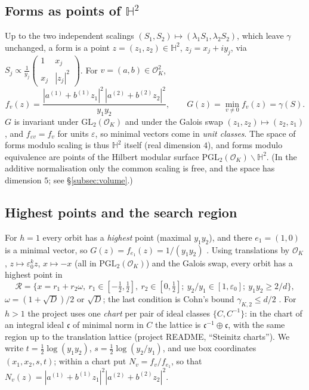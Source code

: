 \documentclass[11pt]{amsart}
\theoremstyle{definition}
\theoremstyle{remark}
\newcommand{\Hb}{\mathbb{H}}
\newcommand{\OK}{\mathcal{O}_K}
\newcommand{\GL}{\mathrm{GL}}
\newcommand{\PGL}{\mathrm{PGL}}
\newcommand{\gK}{\gamma_{K,2}}
\begin{document}
\subsection{Forms as points of $\Hb^2$}
Up to the two independent scalings $(S_1,S_2)\mapsto(\lambda_1S_1,\lambda_2S_2)$, which leave
$\gamma$ unchanged, a form is a point $z=(z_1,z_2)\in\Hb^2$, $z_j=x_j+iy_j$, via
$S_j\propto\frac1{y_j}\begin{pmatrix}1&x_j\\x_j&|z_j|^2\end{pmatrix}$.  For $v=(a,b)\in\OK^2$,
\[
f_v(z)=\frac{|a^{(1)}+b^{(1)}z_1|^2\,|a^{(2)}+b^{(2)}z_2|^2}{y_1y_2},\qquad
G(z)=\min_{v\ne0}f_v(z)=\gamma(S).
\]
$G$ is invariant under $\GL_2(\OK)$ and under the Galois swap $(z_1,z_2)\mapsto(z_2,z_1)$, and
$f_{\varepsilon v}=f_v$ for units $\varepsilon$, so minimal vectors come in \emph{unit classes}.
The space of forms modulo scaling is thus $\Hb^2$ itself (real dimension $4$), and forms modulo
equivalence are points of the Hilbert modular surface $\PGL_2(\OK)\backslash\Hb^2$.
(In the additive normalisation only the common scaling is free, and the space has dimension
$5$; see \S\ref{subsec:volume}.)

\subsection{Highest points and the search region}
For $h=1$ every orbit has a \emph{highest} point (maximal $y_1y_2$), and there $e_1=(1,0)$ is
a minimal vector, so $G(z)=f_{e_1}(z)=1/(y_1y_2)$ \cite[Prop.~1.1]{BCIO}.  Using translations
by $\OK$, $z\mapsto\varepsilon_0^kz$, $x\mapsto-x$ (all in $\PGL_2(\OK)$) and the Galois swap,
every orbit has a highest point in
\[
\mathcal R=\{x=r_1+r_2\omega,\ r_1\in[-\tfrac12,\tfrac12],\ r_2\in[0,\tfrac12];\
y_2/y_1\in[1,\varepsilon_0];\ y_1y_2\ge 2/d\},
\]
$\omega=(1+\sqrt D)/2$ or $\sqrt D$; the last condition is Cohn's bound $\gK\le d/2$
\cite{Cohn1,Cohn2}.  For $h>1$ the project uses one \emph{chart} per pair of ideal classes
$\{C,C^{-1}\}$: in the chart of an integral ideal $\mathfrak c$ of minimal norm in $C$ the
lattice is $\mathfrak c^{-1}\oplus\mathfrak c$, with the same region up to the translation lattice
(project README, ``Steinitz charts'').  We write $t=\frac12\log(y_1y_2)$,
$s=\frac12\log(y_2/y_1)$, and use box coordinates $(x_1,x_2,s,t)$; within a chart put
$N_v=f_v/f_{e_1}$, so that $N_v(z)=|a^{(1)}+b^{(1)}z_1|^2|a^{(2)}+b^{(2)}z_2|^2$.
\end{document}
